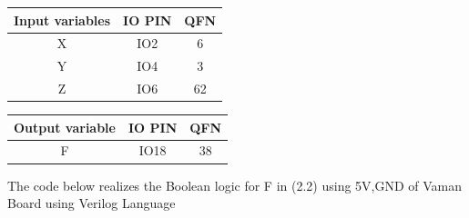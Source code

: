 \documentclass[10pt, a4paper]{article}
\begin{document}
\begin{center}
\begin{tabular}{|c|c|c|}
\hline
\textbf{Input variables}&\textbf{IO PIN}&\textbf{QFN}\\
\hline
X & IO2&6\\  
\hline
Y & IO4 &3\\ 
\hline
Z & IO6 &62\\
\hline
\end{tabular}
\end{center}
\begin{center}
\begin{tabular}{|c|c|c|}
\hline
\textbf{Output variable}&\textbf{IO PIN}&\textbf{QFN}\\
\hline
F & IO18 &38\\  
\hline
\end{tabular}
\end{center}
The code below realizes the Boolean logic for F in (2.2)  using 5V,GND of Vaman Board using Verilog Language
\begin{center}
\end{center}
\end{document}
